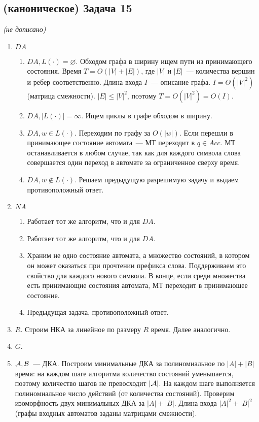 \documentclass[a4paper]{article}
\def\A{{\cal A}}
\def\B{{\cal B}}
\begin{document}
\subsection*{(каноническое) Задача 15}
{\em (не дописано)}
\begin{enumerate}
\item $DA$
\begin{enumerate}
\item $DA, L(\cdot)=\varnothing$. Обходом графа в ширину ищем пути из принимающего состояния. Время $T=O(|V|+|E|)$, где $|V|$ и $|E|$~--- количества вершин и ребер соответственно. Длина входа $I$~--- описание графа. $I=\Theta(|V|^2)$ (матрица смежности). $|E|\leqslant |V|^2$, поэтому $T=O(|V|^2)=O(I)$.
\item $DA, |L(\cdot)|=\infty$. Ищем циклы в графе обходом в ширину.
\item $DA, w\in L(\cdot)$. Переходим по графу за $O(|w|)$. Если перешли в принимающее состояние автомата~--- МТ переходит в $q\in Acc$. МТ останавливается в любом случае, так как для каждого символа слова совершается один переход в автомате за ограниченное сверху время.
\item $DA, w\notin L(\cdot)$. Решаем предыдущую разрешимую задачу и выдаем противоположный ответ.
\end{enumerate}
\item $NA$
\begin{enumerate}
\item Работает тот же алгоритм, что и для $DA$.
\item Работает тот же алгоритм, что и для $DA$.
\item Храним не одно состояние автомата, а множество состояний, в котором он может оказаться при прочтении префикса слова. Поддерживаем это свойство для каждого нового символа. В конце, если среди множества есть принимающие состояния автомата, МТ переходит в принимающее состояние.
\item Предыдущая задача, противоположный ответ.
\end{enumerate}
\item $R$. Строим НКА за линейное по размеру $R$ время. Далее аналогично.
\item $G$.
\item $\A, \B$~--- ДКА. Построим минимальные ДКА за полиномиальное по $|A|+|B|$ время: на каждом шаге алгоритма количество состояний уменьшается, поэтому количество шагов не превосходит $|\A|$. На каждом шаге выполняется полиномиальное число действий (от количества состояний). Проверим изоморфность двух минимальных ДКА за $|A|+|B|$. Длина входа $|A|^2+|B|^2$ (графы входных автоматов заданы матрицами смежности).
\end{enumerate}
\end{document}
